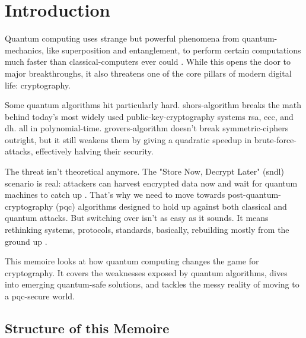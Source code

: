 \chapter{Introduction}\label{chap:introduction}

Quantum computing uses strange but powerful phenomena from \gls{quantum-mechanics}, like \gls{superposition} and \gls{entanglement}, to perform certain computations much faster than \gls{classical-computer}s ever could \parencite{Berberich2023QuantumCT, Liu2023IntroductionTQ}. While this opens the door to major breakthroughs, it also threatens one of the core pillars of modern digital life: \gls{cryptography}.

Some quantum algorithms hit particularly hard. \gls{shors-algorithm} \parencite{shor1997polynomial} breaks the math behind today's most widely used \gls{public-key-cryptography} systems \gls{rsa}, \gls{ecc}, and \gls{dh}. all in \gls{polynomial-time}. \gls{grovers-algorithm} doesn't break \gls{symmetric-cipher}s outright, but it still weakens them by giving a quadratic speedup in \gls{brute-force-attack}s, effectively halving their security.

The threat isn't theoretical anymore. The "Store Now, Decrypt Later" (\gls{sndl}) scenario is real: attackers can harvest encrypted data now and wait for quantum machines to catch up \parencite{nist_pqc_timeline_2024, Geremew2024PreparingCI, Regenscheid2024TransitionTP}. That's why we need to move towards \gls{post-quantum-cryptography} (\gls{pqc}) algorithms designed to hold up against both classical and quantum attacks. But switching over isn't as easy as it sounds. It means rethinking systems, protocols, standards, basically, rebuilding mostly from the ground up \parencite{nist_pqc_timeline_2024, Geremew2024PreparingCI, Regenscheid2024TransitionTP}.

This memoire looks at how quantum computing changes the game for \gls{cryptography}. It covers the weaknesses exposed by quantum algorithms, dives into emerging quantum-safe solutions, and tackles the messy reality of moving to a \gls{pqc}-secure world.

\newpage
\section{Structure of this Memoire}


